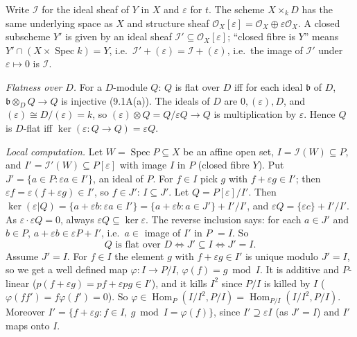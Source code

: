\documentclass[11pt]{article}
\begin{document}
\pf
Write $\mathcal I$ for the ideal sheaf of $Y$ in $X$ and $\varepsilon$ for $t$. The scheme $X\times_kD$ has the same underlying space as $X$ and structure sheaf $\mathcal O_X[\varepsilon]=\mathcal O_X\oplus\varepsilon\mathcal O_X$. A closed subscheme $Y'$ is given by an ideal sheaf $\mathcal I'\subseteq\mathcal O_X[\varepsilon]$; ``closed fibre is $Y$'' means $Y'\cap(X\times\operatorname{Spec}k)=Y$, i.e.\ $\mathcal I'+(\varepsilon)=\mathcal I+(\varepsilon)$, i.e.\ the image of $\mathcal I'$ under $\varepsilon\mapsto0$ is $\mathcal I$.

\emph{Flatness over $D$.} For a $D$-module $Q$: $Q$ is flat over $D$ iff for each ideal $\mathfrak b$ of $D$, $\mathfrak b\otimes_DQ\to Q$ is injective (9.1A(a)). The ideals of $D$ are $0,(\varepsilon),D$, and $(\varepsilon)\cong D/(\varepsilon)=k$, so $(\varepsilon)\otimes Q=Q/\varepsilon Q\to Q$ is multiplication by $\varepsilon$. Hence $Q$ is $D$-flat iff $\ker(\varepsilon:Q\to Q)=\varepsilon Q$.

\emph{Local computation.} Let $W=\operatorname{Spec}P\subseteq X$ be an affine open set, $I=\mathcal I(W)\subseteq P$, and $I'=\mathcal I'(W)\subseteq P[\varepsilon]$ with image $I$ in $P$ (closed fibre $Y$). Put $J'=\{a\in P:\varepsilon a\in I'\}$, an ideal of $P$. For $f\in I$ pick $g$ with $f+\varepsilon g\in I'$; then $\varepsilon f=\varepsilon(f+\varepsilon g)\in I'$, so $f\in J'$: $I\subseteq J'$. Let $Q=P[\varepsilon]/I'$. Then $\ker(\varepsilon|Q)=\{a+\varepsilon b:\varepsilon a\in I'\}=\{a+\varepsilon b:a\in J'\}+I'/I'$, and $\varepsilon Q=\{\varepsilon c\}+I'/I'$. As $\varepsilon\cdot\varepsilon Q=0$, always $\varepsilon Q\subseteq\ker\varepsilon$. The reverse inclusion says: for each $a\in J'$ and $b\in P$, $a+\varepsilon b\in\varepsilon P+I'$, i.e.\ $a\in$ image of $I'$ in $P$ $=I$. So
\[
Q\text{ is flat over }D\iff J'\subseteq I\iff J'=I .
\]
Assume $J'=I$. For $f\in I$ the element $g$ with $f+\varepsilon g\in I'$ is unique modulo $J'=I$, so we get a well defined map $\varphi:I\to P/I$, $\varphi(f)=g\bmod I$. It is additive and $P$-linear ($p(f+\varepsilon g)=pf+\varepsilon pg\in I'$), and it kills $I^2$ since $P/I$ is killed by $I$ ($\varphi(ff')=f\varphi(f')=0$). So $\varphi\in\operatorname{Hom}_P(I/I^2,P/I)=\operatorname{Hom}_{P/I}(I/I^2,P/I)$. Moreover $I'=\{f+\varepsilon g:f\in I,\ g\bmod I=\varphi(f)\}$, since $I'\supseteq\varepsilon I$ (as $J'=I$) and $I'$ maps onto $I$.
\end{document}
